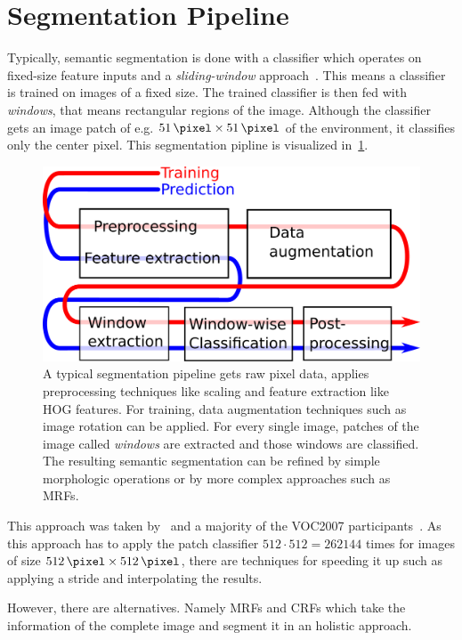 
\section{Segmentation Pipeline}

Typically, semantic segmentation is done with a classifier which operates on
fixed-size feature inputs and a \textit{sliding-window}
approach~\cite{1467360,5490399,schroff2008object}. This means a classifier is
trained on images of a fixed size. The trained classifier is then fed with
\textit{windows}, that means rectangular regions of the image. Although the
classifier gets an image patch of e.g. $\SI{51}{\pixel} \times \SI{51}{\pixel}$
of the environment, it classifies only the center pixel. This segmentation
pipline is visualized in~\cref{fig:segmentation-pipeline}.

\begin{figure}
    \centering
    \includegraphics[width=\linewidth, keepaspectratio]{figures/segmentation-pipeline.pdf}
    \caption{A typical segmentation pipeline gets raw pixel data, applies
             preprocessing techniques like scaling and feature extraction like
             HOG features. For training, data augmentation techniques such as
             image rotation can be applied. For every single image, patches
             of the image called \textit{windows} are extracted and those
             windows are classified. The resulting semantic segmentation can
             be refined by simple morphologic operations or by more complex
             approaches such as \glspl{MRF}.}
    \label{fig:segmentation-pipeline}
\end{figure}

This approach was taken by~\cite{bittel2015pixel} and a majority of the VOC2007
participants~\cite{pascal-voc-2007}. As this approach has to apply the patch
classifier $512 \cdot 512 = \num{262144}$ times for images of size
$\SI{512}{\pixel} \times \SI{512}{\pixel}$, there are techniques for speeding
it up such as applying a stride and interpolating the results.

However, there are alternatives. Namely \glspl{MRF} and \glspl{CRF}
which take the information of the complete image and segment it in an holistic
approach.
